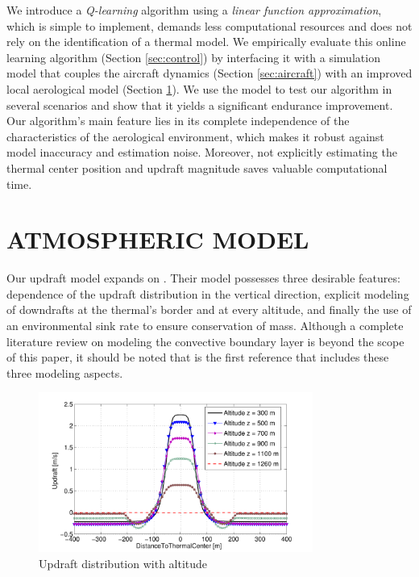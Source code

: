 \documentclass[a4paper, 10pt, conference]{ieeeconf}
\begin{document}
We introduce a \emph{Q-learning} algorithm using a \emph{linear function approximation}, which is simple to implement, demands less computational resources and does not rely on the identification of a thermal model.
We empirically evaluate this online learning algorithm (Section \ref{sec:control}) by interfacing it with a simulation model that couples the aircraft dynamics (Section \ref{sec:aircraft}) with an improved local aerological model (Section \ref{sec:atmos}).
We use the model to test our algorithm in several scenarios and show that it yields a significant endurance improvement. Our algorithm's main feature lies in its complete independence of the characteristics of the aerological environment, which makes it robust against model inaccuracy and estimation noise. Moreover, not explicitly estimating the thermal center position and updraft magnitude saves valuable computational time.

\section{ATMOSPHERIC MODEL}
\label{sec:atmos}

Our updraft model expands on \cite{allen_thermal}. Their model possesses three desirable features: dependence of the updraft distribution in the vertical direction, explicit modeling of downdrafts at the thermal's border and at every altitude, and finally the use of an environmental sink rate to ensure conservation of mass. Although a complete literature review on modeling the convective boundary layer is beyond the scope of this paper, it should be noted that \cite{allen_thermal} is the first reference that includes these three modeling aspects.


\begin{figure}%
\begin{center}
 \includegraphics[width=9cm]{img/total_updraft.pdf}
\end{center}
 \caption{Updraft distribution with altitude}
 \label{fig:updraft_distribution}
\end{figure}
\end{document}
